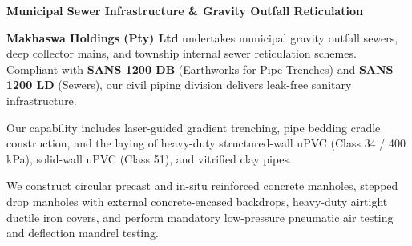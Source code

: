 \hypertarget{sec:sewer}{}

\noindent
\begin{minipage}[t]{0.62\textwidth}
    \vspace{0pt}
    {\large\bfseries\color{mhnavy} Municipal Sewer Infrastructure \& Gravity Outfall Reticulation}
    \vspace{0.12cm}

    {\fontsize{9pt}{13pt}\selectfont\color{mhtext}
    \textbf{Makhaswa Holdings (Pty) Ltd} undertakes municipal gravity outfall sewers, deep collector mains, and township internal sewer reticulation schemes. Compliant with \textbf{SANS 1200 DB} (Earthworks for Pipe Trenches) and \textbf{SANS 1200 LD} (Sewers), our civil piping division delivers leak-free sanitary infrastructure.
    }

    \vspace{0.22cm}

    {\fontsize{9pt}{13pt}\selectfont\color{mhtext}
    Our capability includes laser-guided gradient trenching, pipe bedding cradle construction, and the laying of heavy-duty structured-wall uPVC (Class 34 / 400 kPa), solid-wall uPVC (Class 51), and vitrified clay pipes.
    }

    \vspace{0.22cm}

    {\fontsize{9pt}{13pt}\selectfont\color{mhtext}
    We construct circular precast and in-situ reinforced concrete manholes, stepped drop manholes with external concrete-encased backdrops, heavy-duty airtight ductile iron covers, and perform mandatory low-pressure pneumatic air testing and deflection mandrel testing.
    }
\end{minipage}
\hfill
